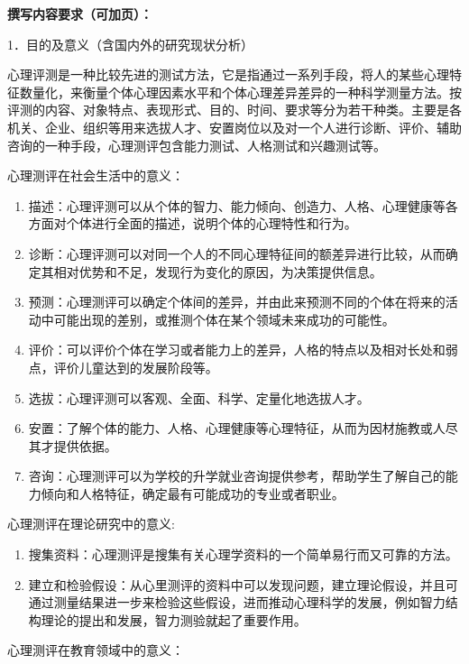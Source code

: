 \documentclass[a4paper]{ctexart}
\begin{document}
{\large \textbf{\fangsong 撰写内容要求（可加页）：}}

{\large \fangsong 
\begin{flushleft}
1．目的及意义（含国内外的研究现状分析）
\end{flushleft}

心理评测是一种比较先进的测试方法，它是指通过一系列手段，将人的某些心理特征数量化，来衡量个体心理因素水平和个体心理差异差异的一种科学测量方法。按评测的内容、对象特点、表现形式、目的、时间、要求等分为若干种类。主要是各机关、企业、组织等用来选拔人才、安置岗位以及对一个人进行诊断、评价、辅助咨询的一种手段，心理测评包含能力测试、人格测试和兴趣测试等。

心理测评在社会生活中的意义：

\begin{enumerate}
	\item 描述：心理评测可以从个体的智力、能力倾向、创造力、人格、心理健康等各方面对个体进行全面的描述，说明个体的心理特性和行为。
	\item 诊断：心理评测可以对同一个人的不同心理特征间的额差异进行比较，从而确定其相对优势和不足，发现行为变化的原因，为决策提供信息。
	\item 预测：心理测评可以确定个体间的差异，并由此来预测不同的个体在将来的活动中可能出现的差别，或推测个体在某个领域未来成功的可能性。
	\item 评价：可以评价个体在学习或者能力上的差异，人格的特点以及相对长处和弱点，评价儿童达到的发展阶段等。
	\item 选拔：心理评测可以客观、全面、科学、定量化地选拔人才。
	\item 安置：了解个体的能力、人格、心理健康等心理特征，从而为因材施教或人尽其才提供依据。
	\item 咨询：心理测评可以为学校的升学就业咨询提供参考，帮助学生了解自己的能力倾向和人格特征，确定最有可能成功的专业或者职业。
\end{enumerate}

心理测评在理论研究中的意义:

\begin{enumerate}
	\item 搜集资料：心理测评是搜集有关心理学资料的一个简单易行而又可靠的方法。
	\item 建立和检验假设：从心里测评的资料中可以发现问题，建立理论假设，并且可通过测量结果进一步来检验这些假设，进而推动心理科学的发展，例如智力结构理论的提出和发展，智力测验就起了重要作用。
\end{enumerate}

心理测评在教育领域中的意义：

}
\end{document}

